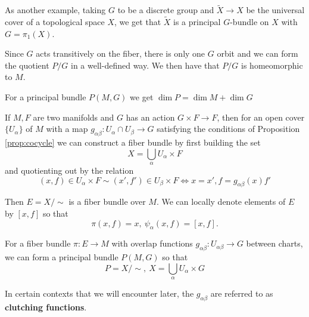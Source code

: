 		\begin{eg}
			As another example, taking $G$ to be a discrete group and $\tilde X \to X$ be the universal cover of a topological space $X$, we get that $\tilde X$ is a principal $G$-bundle on $X$ with $G=\pi_1(X)$.
		\end{eg}
		
		Since $G$ acts transitively on the fiber, there is only one $G$ orbit and we can form the quotient $P/G$ in a well-defined way. We then have that $P/G$ is homeomorphic to $M$.
		\begin{cor}
			For a principal bundle $P(M,G)$ we get $\dim P = \dim M + \dim G$
		\end{cor}
		
		If $M,F$ are two manifolds and $G$ has an action $G \times F \rightarrow F$, then for an open cover $\{ U_\alpha \}$ of $M$ with a map $g_{\alpha \beta}: U_{\alpha}\cap U_{\beta} \to G$ satisfying the conditions of Proposition \ref{prop:cocycle} we can construct a fiber bundle by first building the set
		\begin{equation}
			X = \bigcup_\alpha U_\alpha \times F
		\end{equation} 
		and quotienting out by the relation
		\begin{equation}
			(x, f) \in U_\alpha \times F \sim (x', f') \in U_\beta \times F \Longleftrightarrow x=x', f=g_{\alpha \beta}(x) f' 
		\end{equation}
		
		Then $E = X/\sim$ is a fiber bundle over $M$. We can locally denote elements of $E$ by $[x,f]$ so that
		\begin{equation}
			\pi(x,f) = x, ~ \psi_\alpha(x,f) = [x,f].
		\end{equation}
		
		\begin{prop}
			For a fiber bundle $\pi: E \rightarrow M$ with overlap functions $g_{\alpha \beta}: U_{\alpha \beta} \rightarrow G$ between charts, we can form a principal bundle $P(M,G)$ so that 
			\begin{equation}
				P = X/\sim, ~ X = \bigcup_\alpha U_\alpha \times G
			\end{equation}
		\end{prop}
		In certain contexts that we will encounter later, the $g_{\alpha \beta}$ are referred to as \textbf{clutching functions}.		%
		
